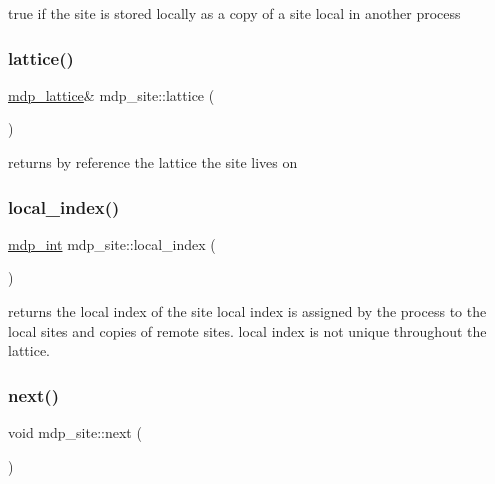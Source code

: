 true if the site is stored locally as a copy of a site local in another process \mbox{\label{classmdp__site_aae3a1de2fd7fafccbd1d6bd971c908c4}} 
\subsubsection{\texorpdfstring{lattice()}{lattice()}}
{\footnotesize\ttfamily \hyperlink{classmdp__lattice}{mdp\+\_\+lattice}\& mdp\+\_\+site\+::lattice (\begin{DoxyParamCaption}{ }\end{DoxyParamCaption})\hspace{0.3cm}{\ttfamily [inline]}}



returns by reference the lattice the site lives on 

\mbox{\label{classmdp__site_a4a19d418044e9bf5e285998676df6f43}} 
\subsubsection{\texorpdfstring{local\+\_\+index()}{local\_index()}}
{\footnotesize\ttfamily \hyperlink{mdp__global__vars_8h_aaa1ad9d0dcd2124aa5af0120d9954174}{mdp\+\_\+int} mdp\+\_\+site\+::local\+\_\+index (\begin{DoxyParamCaption}{ }\end{DoxyParamCaption})\hspace{0.3cm}{\ttfamily [inline]}}

returns the local index of the site local index is assigned by the process to the local sites and copies of remote sites. local index is not unique throughout the lattice. \mbox{\label{classmdp__site_a19445777d77aaf38ff3bd15d48c7c683}} 
\subsubsection{\texorpdfstring{next()}{next()}}
{\footnotesize\ttfamily void mdp\+\_\+site\+::next (\begin{DoxyParamCaption}{ }\end{DoxyParamCaption})\hspace{0.3cm}{\ttfamily [inline]}}

